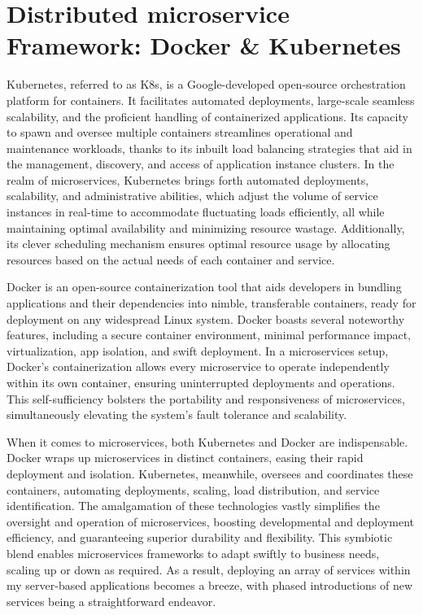 \documentclass[12pt,two side]{report}
\begin{document}
\section{Distributed microservice Framework: Docker \& Kubernetes}
Kubernetes, referred to as K8s, is a Google-developed open-source orchestration platform for containers. It facilitates automated deployments, large-scale seamless scalability, and the proficient handling of containerized applications. Its capacity to spawn and oversee multiple containers streamlines operational and maintenance workloads, thanks to its inbuilt load balancing strategies that aid in the management, discovery, and access of application instance clusters. In the realm of microservices, Kubernetes brings forth automated deployments, scalability, and administrative abilities, which adjust the volume of service instances in real-time to accommodate fluctuating loads efficiently, all while maintaining optimal availability and minimizing resource wastage. Additionally, its clever scheduling mechanism ensures optimal resource usage by allocating resources based on the actual needs of each container and service.\newline

Docker is an open-source containerization tool that aids developers in bundling applications and their dependencies into nimble, transferable containers, ready for deployment on any widespread Linux system. Docker boasts several noteworthy features, including a secure container environment, minimal performance impact, virtualization, app isolation, and swift deployment. In a microservices setup, Docker's containerization allows every microservice to operate independently within its own container, ensuring uninterrupted deployments and operations. This self-sufficiency bolsters the portability and responsiveness of microservices, simultaneously elevating the system's fault tolerance and scalability.\newline

When it comes to microservices, both Kubernetes and Docker are indispensable. Docker wraps up microservices in distinct containers, easing their rapid deployment and isolation. Kubernetes, meanwhile, oversees and coordinates these containers, automating deployments, scaling, load distribution, and service identification. The amalgamation of these technologies vastly simplifies the oversight and operation of microservices, boosting developmental and deployment efficiency, and guaranteeing superior durability and flexibility. This symbiotic blend enables microservices frameworks to adapt swiftly to business needs, scaling up or down as required. As a result, deploying an array of services within my server-based applications becomes a breeze, with phased introductions of new services being a straightforward endeavor.
\end{document}
